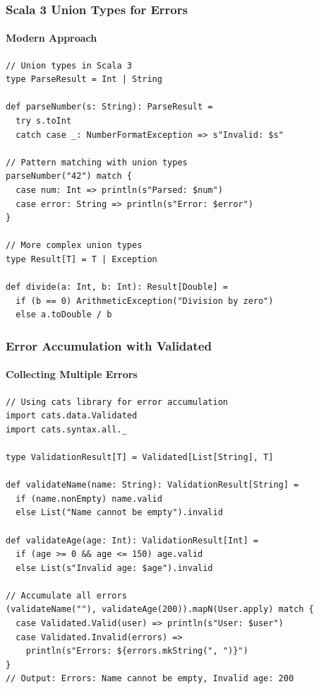 \documentclass{beamer}
\begin{document}
\begin{frame}[fragile]
\frametitle{Scala 3 Union Types for Errors}
\framesubtitle{Modern Approach}

\begin{lstlisting}[style=scalaStyle]
// Union types in Scala 3
type ParseResult = Int | String

def parseNumber(s: String): ParseResult = 
  try s.toInt
  catch case _: NumberFormatException => s"Invalid: $s"

// Pattern matching with union types
parseNumber("42") match {
  case num: Int => println(s"Parsed: $num")
  case error: String => println(s"Error: $error")
}

// More complex union types
type Result[T] = T | Exception

def divide(a: Int, b: Int): Result[Double] = 
  if (b == 0) ArithmeticException("Division by zero")
  else a.toDouble / b
\end{lstlisting}

\end{frame}

\begin{frame}[fragile]
\frametitle{Error Accumulation with Validated}
\framesubtitle{Collecting Multiple Errors}

\begin{lstlisting}[style=scalaStyle]
// Using cats library for error accumulation
import cats.data.Validated
import cats.syntax.all._

type ValidationResult[T] = Validated[List[String], T]

def validateName(name: String): ValidationResult[String] = 
  if (name.nonEmpty) name.valid
  else List("Name cannot be empty").invalid

def validateAge(age: Int): ValidationResult[Int] = 
  if (age >= 0 && age <= 150) age.valid
  else List(s"Invalid age: $age").invalid

// Accumulate all errors
(validateName(""), validateAge(200)).mapN(User.apply) match {
  case Validated.Valid(user) => println(s"User: $user")
  case Validated.Invalid(errors) => 
    println(s"Errors: ${errors.mkString(", ")}")
}
// Output: Errors: Name cannot be empty, Invalid age: 200
\end{lstlisting}

\end{frame}
\end{document}
